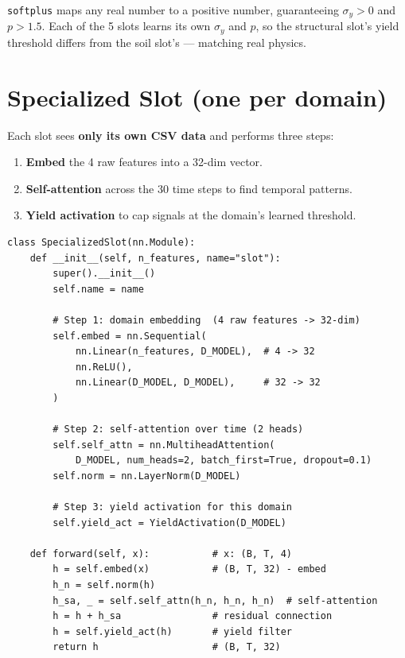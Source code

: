 \documentclass[12pt,a4paper]{article}
\begin{document}
\texttt{softplus} maps any real number to a positive number, guaranteeing $\sigma_y>0$ and $p>1.5$.
Each of the 5 slots learns its own $\sigma_y$ and $p$, so the structural slot's yield threshold differs from the soil slot's — matching real physics.

\section{Specialized Slot (one per domain)}

Each slot sees \textbf{only its own CSV data} and performs three steps:

\begin{enumerate}[nosep]
  \item \textbf{Embed} the 4 raw features into a 32-dim vector.
  \item \textbf{Self-attention} across the 30 time steps to find temporal patterns.
  \item \textbf{Yield activation} to cap signals at the domain's learned threshold.
\end{enumerate}

\begin{lstlisting}[caption={SpecializedSlot — one domain expert.}]
class SpecializedSlot(nn.Module):
    def __init__(self, n_features, name="slot"):
        super().__init__()
        self.name = name

        # Step 1: domain embedding  (4 raw features -> 32-dim)
        self.embed = nn.Sequential(
            nn.Linear(n_features, D_MODEL),  # 4 -> 32
            nn.ReLU(),
            nn.Linear(D_MODEL, D_MODEL),     # 32 -> 32
        )

        # Step 2: self-attention over time (2 heads)
        self.self_attn = nn.MultiheadAttention(
            D_MODEL, num_heads=2, batch_first=True, dropout=0.1)
        self.norm = nn.LayerNorm(D_MODEL)

        # Step 3: yield activation for this domain
        self.yield_act = YieldActivation(D_MODEL)

    def forward(self, x):           # x: (B, T, 4)
        h = self.embed(x)           # (B, T, 32) - embed
        h_n = self.norm(h)
        h_sa, _ = self.self_attn(h_n, h_n, h_n)  # self-attention
        h = h + h_sa                # residual connection
        h = self.yield_act(h)       # yield filter
        return h                    # (B, T, 32)
\end{lstlisting}
\end{document}
